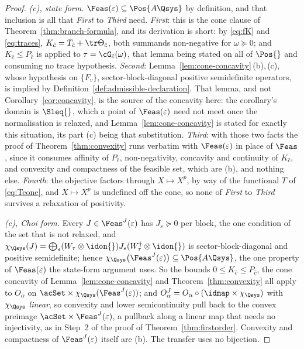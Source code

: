\begin{proof}
\emph{(c), state form.} $\Feas(\varepsilon)\subseteq\Pos{A\Qsys}$ by
definition, and that inclusion is all that \emph{First} to \emph{Third}
need. \emph{First}: this is the cone clause of
Theorem~\ref{thm:branch-formula}, and its derivation is short: by
\eqref{eq:fK} and \eqref{eq:traces},
$K_{\hat c}=T_{\hat c}+\tr\Theta_{\hat c}$, both summands non-negative for
$\omega\succeq0$; and $K_{\hat c}\le P_{\hat c}$ is
 applied to $\tau=\cG_{\hat c}(\omega)$,
that lemma being stated on all of $\Pos{}$ and consuming no trace
hypothesis. \emph{Second}: Lemma~\ref{lem:cone-concavity}\,(b),\,(c),
whose hypothesis on $\{F_v\}$, sector-block-diagonal positive semidefinite
operators, is implied by Definition~\ref{def:admissible-declaration}. That lemma, and not
Corollary~\ref{cor:concavity}, is the source of the concavity here: the
corollary's domain is $\Sleq{}$, which a point of $\Feas(\varepsilon)$
need not meet once the normalisation is relaxed, and
Lemma~\ref{lem:cone-concavity} is stated for exactly this situation, its
part (c) being that substitution. \emph{Third}: with those two facts the
proof of Theorem~\ref{thm:convexity} runs verbatim with
$\Feas(\varepsilon)$ in place of $\Feas$, since it consumes affinity of
$P_{\hat c}$, non-negativity, concavity and continuity of $K_{\hat c}$, and
convexity and compactness of the feasible set, which are (b), and nothing
else. \emph{Fourth}: the objective factors through $X\mapsto X^{p}$, by
way of the functional $T$ of \eqref{eq:Tcone}, and $X\mapsto X^{p}$ is
undefined off the cone, so none of \emph{First} to \emph{Third} survives a
relaxation of positivity.

\emph{(c), Choi form.} Every $J\in\Feas^{J}(\varepsilon)$ has
$J_s\succeq0$ per block, the one condition of the set that is not relaxed,
and $\chi_{\Qsys}(J)=\bigoplus_s
(W_{\tau}\otimes\idon{})J_s(W_{\tau}^{\dagger}\otimes\idon{})$ is
sector-block-diagonal and positive semidefinite; hence
$\chi_{\Qsys}\big(\Feas^{J}(\varepsilon)\big)\subseteq\Pos{A\Qsys}$, the
one property of $\Feas(\varepsilon)$ the state-form argument uses. So the
bounds $0\le K_{\hat c}\le P_{\hat c}$, the cone concavity of
Lemma~\ref{lem:cone-concavity} and Theorem~\ref{thm:convexity} all apply
to $O_{\alpha}$ on $\acSet\times\chi_{\Qsys}(\Feas^{J}(\varepsilon))$; and
$O^{J}_{\alpha}=O_{\alpha}\circ(\idmap\times\chi_{\Qsys})$ with
$\chi_{\Qsys}$ \emph{linear}, so convexity and lower semicontinuity pull
back to the convex preimage $\acSet\times\Feas^{J}(\varepsilon)$, a
pullback along a linear map that needs no injectivity, as in Step~2 of the
proof of Theorem~\ref{thm:firstorder}. Convexity and compactness of
$\Feas^{J}(\varepsilon)$ itself are (b). The transfer uses no bijection.


\end{proof}

